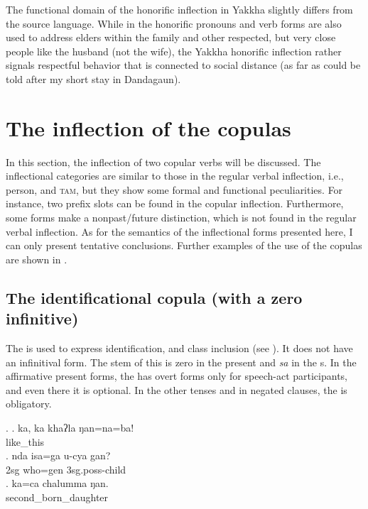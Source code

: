 The functional domain of the honorific inflection in Yakkha slightly differs from the source language. While in  the honorific pronouns and verb forms are also used to address elders within the family and other respected, but very close people like the husband (not the wife), the Yakkha  honorific inflection rather signals respectful behavior that is connected to social distance (as far as could be told after my short stay in Dandagaun).


\section{The inflection of the copulas}\label{cop-infl}
 
In this section, the inflection of two copular verbs will be discussed. The inflectional categories are similar to those in the regular verbal inflection, i.e., person,  and \textsc{tam}, but they show some formal and functional peculiarities. For instance, two prefix slots can be found in the copular inflection. Furthermore, some forms make a nonpast/future distinction, which is not found in the regular verbal inflection. As for the semantics of the inflectional forms presented here, I can only present tentative conclusions. Further examples of the use of the copulas are shown in . 

\subsection{The identificational copula (with a zero {infinitive})}

The  is used to express identification,  and class inclusion (see \Next). It does not have an infinitival form. The stem of this  is zero in the present  and \emph{sa} in the s. In the affirmative present forms, the  has overt forms only for speech-act participants, and even there it is optional. In the other tenses and in negated clauses, the  is obligatory. 


\ex. \ag. ka, ka khaʔla    ŋan=na=ba!      \\
    like\_this \\
\bg. nda isa=ga u-cya gan?\\
{\sc 2sg} who{\sc =gen} {\sc 3sg.poss}-child  \\
\bg. ka=ca chalumma ŋan.\\
 second\_born\_daughter  \\


